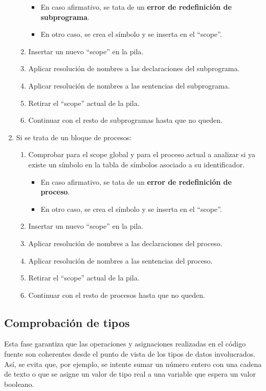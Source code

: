 \begin{enumerate}
\begin{enumerate}
\begin{itemize}
            \item En caso afirmativo, se tata de un \textbf{error de redefinición de subprograma}.
            \item En otro caso, se crea el símbolo y se inserta en el ``scope''.
        \end{itemize}
        \item Insertar un nuevo ``scope'' en la pila.
        \item Aplicar resolución de nombres a las declaraciones del subprograma.
        \item Aplicar resolución de nombres a las sentencias del subprograma.
        \item Retirar el ``scope'' actual de la pila.

        \item Continuar con el resto de subprogramas hasta que no queden.
    \end{enumerate}
    \item Si se trata de un bloque de procesos:
    \begin{enumerate}
        \item Comprobar para el scope global y para el proceso actual a analizar si ya existe un símbolo en la tabla de símbolos asociado a su identificador.
        \begin{itemize}
            \item En caso afirmativo, se tata de un \textbf{error de redefinición de proceso}.
            \item En otro caso, se crea el símbolo y se inserta en el ``scope''.
        \end{itemize}
        \item Insertar un nuevo ``scope'' en la pila.
        \item Aplicar resolución de nombres a las declaraciones del proceso.
        \item Aplicar resolución de nombres a las sentencias del proceso.
        \item Retirar el ``scope'' actual de la pila.

        \item Continuar con el resto de procesos hasta que no queden.
    \end{enumerate}
\end{enumerate}

\subsection{Comprobación de tipos}
Esta fase garantiza que las operaciones y asignaciones realizadas en el código fuente son coherentes desde el punto de vista de los tipos de datos involucrados. Así, se evita que, por ejemplo, se intente sumar un número entero con una cadena de texto o que se asigne un valor de tipo real a una variable que espera un valor booleano.

